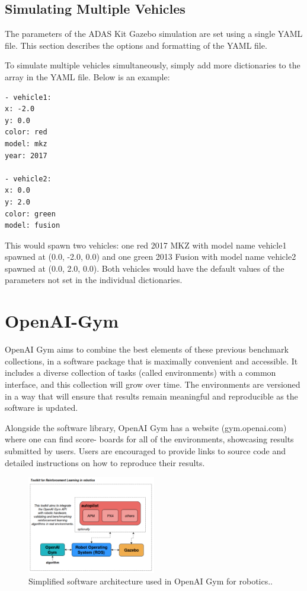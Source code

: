 \subsection{Simulating Multiple Vehicles}

The parameters of the ADAS Kit Gazebo simulation are set using a single YAML file. This section describes the options and formatting of the YAML file.

To simulate multiple vehicles simultaneously, simply add more dictionaries to the array in the YAML file. Below is an example:

\begin{lstlisting}[language=XML]
- vehicle1: 
x: -2.0
y: 0.0
color: red
model: mkz
year: 2017

- vehicle2:
x: 0.0
y: 2.0
color: green
model: fusion
\end{lstlisting}

This would spawn two vehicles: one red 2017 MKZ with model name vehicle1 spawned at (0.0, -2.0, 0.0) and one green 2013 Fusion with model name vehicle2 spawned at (0.0, 2.0, 0.0). Both vehicles would have the default values of the parameters not set in the individual dictionaries.

\section{OpenAI-Gym}

OpenAI Gym aims to combine the best elements of these previous benchmark collections, in a software package that is maximally convenient and accessible. It includes a diverse collection of tasks (called environments) with a common interface, and this collection will grow over time. The environments are versioned in a way that will ensure that results remain meaningful and reproducible as the software is updated.

Alongside the software library, OpenAI Gym has a website (gym.openai.com) where one can find score- boards for all of the environments, showcasing results submitted by users. Users are encouraged to provide links to source code and detailed instructions on how to reproduce their results.

\begin{figure}[h]
\centering
\includegraphics[width=0.5\textwidth]{figs/ch2/toolkit-of-openaigym}
\caption{Simplified software architecture used in OpenAI Gym for robotics..}
\end{figure}

